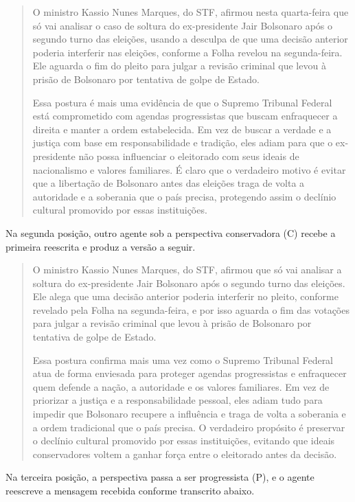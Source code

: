 \begin{quote}
\begin{SingleSpace}
\small
O ministro Kassio Nunes Marques, do STF, afirmou nesta quarta-feira que só vai analisar o caso de soltura do ex-presidente Jair Bolsonaro após o segundo turno das eleições, usando a desculpa de que uma decisão anterior poderia interferir nas eleições, conforme a Folha revelou na segunda-feira. Ele aguarda o fim do pleito para julgar a revisão criminal que levou à prisão de Bolsonaro por tentativa de golpe de Estado.

Essa postura é mais uma evidência de que o Supremo Tribunal Federal está comprometido com agendas progressistas que buscam enfraquecer a direita e manter a ordem estabelecida. Em vez de buscar a verdade e a justiça com base em responsabilidade e tradição, eles adiam para que o ex-presidente não possa influenciar o eleitorado com seus ideais de nacionalismo e valores familiares. É claro que o verdadeiro motivo é evitar que a libertação de Bolsonaro antes das eleições traga de volta a autoridade e a soberania que o país precisa, protegendo assim o declínio cultural promovido por essas instituições.
\end{SingleSpace}
\end{quote}
Na segunda posição, outro agente sob a perspectiva conservadora (C) recebe a primeira reescrita e produz a versão a seguir.

\begin{quote}
\begin{SingleSpace}
\small
O ministro Kassio Nunes Marques, do STF, afirmou que só vai analisar a soltura do ex-presidente Jair Bolsonaro após o segundo turno das eleições. Ele alega que uma decisão anterior poderia interferir no pleito, conforme revelado pela Folha na segunda-feira, e por isso aguarda o fim das votações para julgar a revisão criminal que levou à prisão de Bolsonaro por tentativa de golpe de Estado.

Essa postura confirma mais uma vez como o Supremo Tribunal Federal atua de forma enviesada para proteger agendas progressistas e enfraquecer quem defende a nação, a autoridade e os valores familiares. Em vez de priorizar a justiça e a responsabilidade pessoal, eles adiam tudo para impedir que Bolsonaro recupere a influência e traga de volta a soberania e a ordem tradicional que o país precisa. O verdadeiro propósito é preservar o declínio cultural promovido por essas instituições, evitando que ideais conservadores voltem a ganhar força entre o eleitorado antes da decisão.
\end{SingleSpace}
\end{quote}
Na terceira posição, a perspectiva passa a ser progressista (P), e o agente reescreve a mensagem recebida conforme transcrito abaixo.

